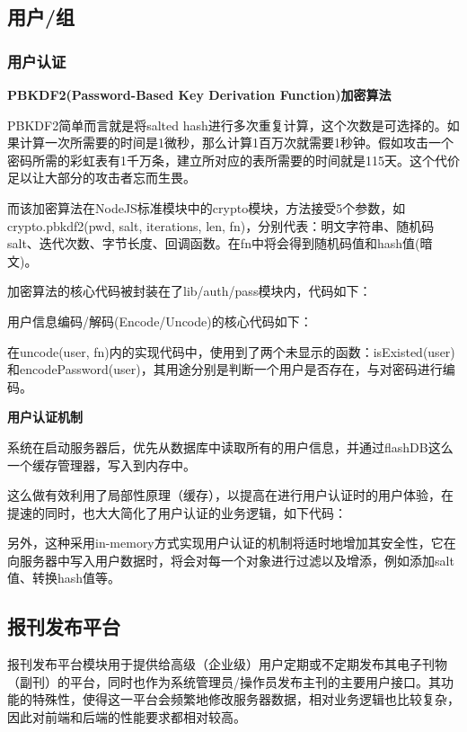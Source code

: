 
\subsection{用户/组}

\subsubsection{用户认证}

\textbf{PBKDF2(Password-Based Key Derivation Function)加密算法}
\par
PBKDF2简单而言就是将salted hash进行多次重复计算，这个次数是可选择的。如果计算一次所需要的时间是1微秒，那么计算1百万次就需要1秒钟。假如攻击一个密码所需的彩虹表有1千万条，建立所对应的表所需要的时间就是115天。这个代价足以让大部分的攻击者忘而生畏。

\indent
而该加密算法在NodeJS标准模块中的crypto模块，方法接受5个参数，如crypto.pbkdf2(pwd, salt, iterations, len, fn)，分别代表：明文字符串、随机码salt、迭代次数、字节长度、回调函数。在fn中将会得到随机码值和hash值(暗文)。

\noindent
加密算法的核心代码被封装在了lib/auth/pass模块内，代码如下：


\noindent
用户信息编码/解码(Encode/Uncode)的核心代码如下：
 \clearpage


\indent
在uncode(user, fn)内的实现代码中，使用到了两个未显示的函数：isExisted(user)和encodePassword(user)，其用途分别是判断一个用户是否存在，与对密码进行编码。

\textbf{用户认证机制}
\par
系统在启动服务器后，优先从数据库中读取所有的用户信息，并通过flashDB这么一个缓存管理器，写入到内存中。 \clearpage


\indent
这么做有效利用了局部性原理（缓存），以提高在进行用户认证时的用户体验，在提速的同时，也大大简化了用户认证的业务逻辑，如下代码：


\indent
另外，这种采用in-memory方式实现用户认证的机制将适时地增加其安全性，它在向服务器中写入用户数据时，将会对每一个对象进行过滤以及增添，例如添加salt值、转换hash值等。



\subsection{报刊发布平台}
报刊发布平台模块用于提供给高级（企业级）用户定期或不定期发布其电子刊物（副刊）的平台，同时也作为系统管理员/操作员发布主刊的主要用户接口。其功能的特殊性，使得这一平台会频繁地修改服务器数据，相对业务逻辑也比较复杂，因此对前端和后端的性能要求都相对较高。

